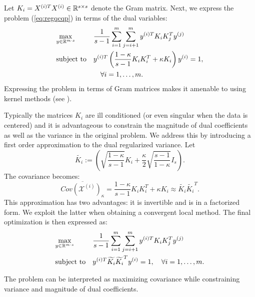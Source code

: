 Let $K_i = X^{(i)T} X^{(i)} \in \mathbb{R}^{s \times s}$ denote the Gram
matrix. Next, we express the problem (\ref{eq:regqcqp}) in terms of the dual variables:
 \begin{equation}\label{eq:dualregqcqp}
\begin{aligned}
& \underset{y \in \mathbb{R}^{m\cdot s}}{\text{max}}
& & \frac{1}{s -1} \sum_{i = 1}^m \sum_{j = i+1}^m y^{(i)T} K_i K_j^T y^{(j)} \\
& \text{subject to}
& & y^{(i)T} \left(\frac{1- \kappa}{s - 1}K_i K_i^T + \kappa  K_i\right) y^{(i)} = 1,\\
& &&\quad\forall i = 1,\ldots, m.
\end{aligned}
\end{equation}
Expressing the problem in terms of Gram matrices makes it amenable to using kernel methods (see \cite{shawe-taylor04kernel}).

Typically the matrices $K_i$ are ill conditioned (or even singular
when the data is centered) and it is advantageous to constrain the
magnitude of dual coefficients as well as the variance in the original
problem. We address this by introducing a first order approximation to
the dual regularized variance. Let
$$\widetilde{K_i} := \left(\sqrt{\frac{1-\kappa}{s - 1}}K_i + \frac{\kappa}{2}
  \sqrt{\frac{s-1}{1- \kappa}}I_s\right).$$
The covariance becomes:
$$ \overline{Cov\left(\mathcal{X}^{(i)}\right)_{\kappa}} =
 \frac{1- \kappa}{s - 1}K_i K_i^T + \kappa  K_i \approx  \widetilde{K_i} \widetilde{K_i}^T.$$
This approximation has two advantages: it is invertible and is in a
factorized form. We exploit the latter when obtaining a convergent local method.
The final optimization is then expressed as:
 \begin{equation}\label{eq:approxdualqcqp}
\begin{aligned}
& \underset{y \in \mathbb{R}^{m\cdot s}}{\text{max}}
& & \frac{1}{s - 1} \sum_{i = 1}^m \sum_{j = i+1}^m y^{(i)T} K_i K_j^T y^{(j)}\\
& \text{subject to}
& & y^{(i)T} \widetilde{K_i} \widetilde{K_i}^T y^{(i)} = 1, \quad\forall i = 1,\ldots, m.
\end{aligned}
\end{equation}

The problem can be interpreted as maximizing covariance while constraining variance
and magnitude of dual coefficients.

